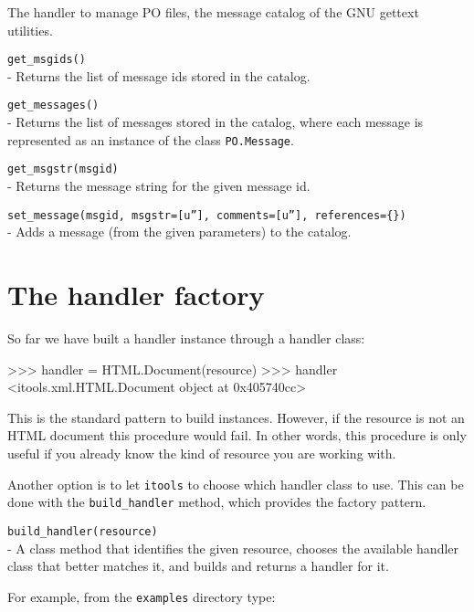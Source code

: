 The handler to manage PO files, the message catalog of the GNU gettext
utilities.

\begin{api}
  {\tt get\_msgids()}\\
  - Returns the list of message ids stored in the catalog.

  {\tt get\_messages()}\\
  - Returns the list of messages stored in the catalog, where each message
    is represented as an instance of the class {\tt PO.Message}.

  {\tt get\_msgstr(msgid)}\\
  - Returns the message string for the given message id.

  {\tt set\_message(msgid, msgstr=[u''], comments=[u''], references=\{\})}\\
  - Adds a message (from the given parameters) to the catalog.
\end{api}


\section{The handler factory}

So far we have built a handler instance through a handler class:

\begin{code}
    >>> handler = HTML.Document(resource)
    >>> handler
    <itools.xml.HTML.Document object at 0x405740cc>
\end{code}

This is the standard pattern to build instances. However, if the resource
is not an HTML document this procedure would fail. In other words, this
procedure is only useful if you already know the kind of resource you
are working with.

Another option is to let {\tt itools} to choose which handler class to use.
This can be done with the {\tt build\_handler} method, which provides the
factory pattern.

\begin{api}
  {\tt build\_handler(resource)}\\
  - A class method that identifies the given resource, chooses the available
  handler class that better matches it, and builds and returns a handler for
  it.
\end{api}

For example, from the {\tt examples} directory type:

